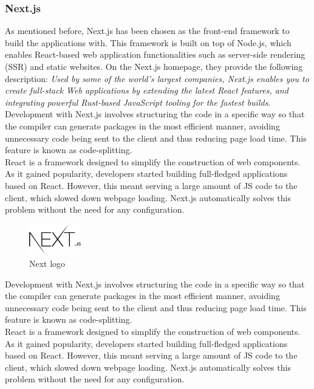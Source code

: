 \documentclass[../memory.tex]{subfiles}
\begin{document}
\subsubsection{Next.js}
As mentioned before, Next.js has been chosen as the front-end framework to build
the applications with. This framework is built on top of Node.js, which enables
React-based web application functionalities such as server-side rendering (SSR)
and static websites. On the Next.js homepage, they provide the following
description: \emph{Used by some of the world's largest companies, Next.js
	enables you to create full-stack Web applications by extending the latest React
	features, and integrating powerful Rust-based JavaScript tooling for the fastest
	builds}\cite{nextjs}.
\\[8pt]
Development with Next.js involves structuring the code in a specific way so
that the compiler can generate packages in the most efficient manner,
avoiding unnecessary code being sent to the client and thus reducing page
load time. This feature is known as code-splitting.
\\
React is a framework designed to simplify the construction of web components. As
it gained popularity, developers started building full-fledged applications
based on React. However, this meant serving a large amount of JS code to the
client, which slowed down webpage loading. Next.js automatically solves this
problem without the need for any configuration.
\begin{figure}[H]
	\centering
	\includegraphics[width=0.2\textwidth]{./assets/logos/next-logo.png}
	\caption{Next logo}
\end{figure}
Development with Next.js involves structuring the code in a specific way so that
the compiler can generate packages in the most efficient manner, avoiding
unnecessary code being sent to the client and thus reducing page load time. This
feature is known as code-splitting.
\\
React is a framework designed to simplify the construction of web components. As
it gained popularity, developers started building full-fledged applications
based on React. However, this meant serving a large amount of JS code to the
client, which slowed down webpage loading. Next.js automatically solves this
problem without the need for any configuration.
\end{document}
